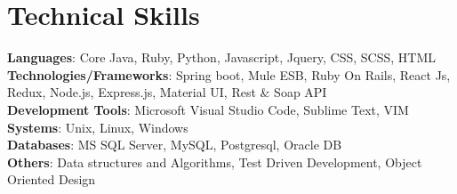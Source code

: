 \documentclass[letterpaper,11pt]{article}
\makeatletter
\newcommand{\resumeItem}[1]{
  \item\small{
    {#1 \vspace{-2pt}}
  }
}
\newcommand{\resumeSubheading}[4]{
  \vspace{-2pt}\item
    \begin{tabular*}{1.0\textwidth}[t]{l@{\extracolsep{\fill}}r}
      \textbf{#1} & \textbf{\small #2} \\
      \textit{\small#3} & \textit{\small #4} \\
    \end{tabular*}\vspace{-7pt}
}
\newcommand{\resumeProjectHeading}[2]{
    \item
    \begin{tabular*}{1.001\textwidth}{l@{\extracolsep{\fill}}r}
      \small#1 & \textbf{\small #2}\\
    \end{tabular*}\vspace{-7pt}
}
\newcommand{\resumeSubHeadingListStart}{\begin{itemize}[leftmargin=0.0in, label={}]}
\newcommand{\resumeSubHeadingListEnd}{\end{itemize}}
\newcommand{\resumeItemListStart}{\begin{itemize}}
\newcommand{\resumeItemListEnd}{\end{itemize}\vspace{-5pt}}
\makeatother
\begin{document}


%
\section{Technical Skills}
 \begin{itemize}[leftmargin=0.15in, label={}]
    \small{\item{
     \textbf{Languages}{: Core Java, Ruby, Python, Javascript, Jquery, CSS, SCSS, HTML} \\
    \textbf{Technologies/Frameworks}{: Spring boot, Mule ESB, Ruby On Rails, React Js, Redux, Node.js, Express.js, Material UI, Rest \& Soap API} \\
    \textbf{Development Tools}{: Microsoft Visual Studio Code, Sublime Text, VIM} \\
    \textbf{Systems}{: Unix, Linux, Windows} \\
    \textbf{Databases}{: MS SQL Server, MySQL, Postgresql, Oracle DB} \\
    \textbf{Others}{: Data structures and Algorithms, Test Driven Development, Object Oriented Design} \\
    }}
 \end{itemize}
 \vspace{-16pt}


        
\end{document}
